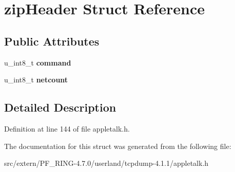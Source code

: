 \hypertarget{structzip_header}{
\section{zipHeader Struct Reference}
\label{structzip_header}
}
\subsection*{Public Attributes}
\begin{DoxyCompactItemize}
\item 
\hypertarget{structzip_header_a9a2db78d49319a356faa616cc1ac0da2}{
u\_\-int8\_\-t {\bfseries command}}
\label{structzip_header_a9a2db78d49319a356faa616cc1ac0da2}

\item 
\hypertarget{structzip_header_acc8f0210db07aed6ab38f510bec6a898}{
u\_\-int8\_\-t {\bfseries netcount}}
\label{structzip_header_acc8f0210db07aed6ab38f510bec6a898}

\end{DoxyCompactItemize}


\subsection{Detailed Description}


Definition at line 144 of file appletalk.h.



The documentation for this struct was generated from the following file:\begin{DoxyCompactItemize}
\item 
src/extern/PF\_\-RING-\/4.7.0/userland/tcpdump-\/4.1.1/appletalk.h\end{DoxyCompactItemize}
